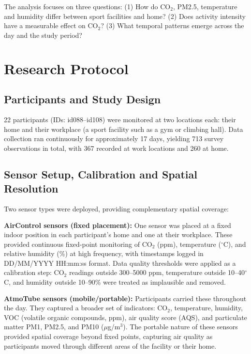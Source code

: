\documentclass[12pt,a4paper]{article}
\begin{document}
The analysis focuses on three questions: (1) How do CO$_2$, PM2.5, temperature and humidity differ between sport facilities and home? (2) Does activity intensity have a measurable effect on CO$_2$? (3) What temporal patterns emerge across the day and the study period?

\section{Research Protocol}

\subsection{Participants and Study Design}

22 participants (IDs: id088--id108) were monitored at two locations each: their home and their workplace (a sport facility such as a gym or climbing hall). Data collection ran continuously for approximately 17 days, yielding 713 survey observations in total, with 367 recorded at work locations and 260 at home.

\subsection{Sensor Setup, Calibration and Spatial Resolution}

Two sensor types were deployed, providing complementary spatial coverage:

\textbf{AirControl sensors (fixed placement):} One sensor was placed at a fixed indoor position in each participant's home and one at their workplace. These provided continuous fixed-point monitoring of CO$_2$ (ppm), temperature ($^\circ$C), and relative humidity (\%) at high frequency, with timestamps logged in DD/MM/YYYY HH:mm:ss format. Data quality thresholds were applied as a calibration step: CO$_2$ readings outside 300--5000 ppm, temperature outside 10--40$^\circ$C, and humidity outside 10--90\% were treated as implausible and removed.

\textbf{AtmoTube sensors (mobile/portable):} Participants carried these throughout the day. They captured a broader set of indicators: CO$_2$, temperature, humidity, VOC (volatile organic compounds, ppm), air quality score (AQS), and particulate matter PM1, PM2.5, and PM10 ($\mu$g/m$^3$). The portable nature of these sensors provided spatial coverage beyond fixed points, capturing air quality as participants moved through different areas of the facility or their home.
\end{document}
